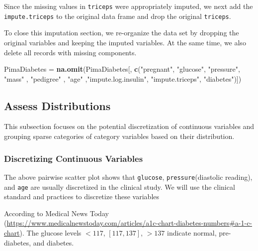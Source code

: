 \documentclass[
]{book}
\newenvironment{Shaded}{\begin{snugshade}}{\end{snugshade}}
\newcommand{\FunctionTok}[1]{\textcolor[rgb]{0.13,0.29,0.53}{\textbf{#1}}}
\newcommand{\NormalTok}[1]{#1}
\newcommand{\OtherTok}[1]{\textcolor[rgb]{0.56,0.35,0.01}{#1}}
\newcommand{\StringTok}[1]{\textcolor[rgb]{0.31,0.60,0.02}{#1}}
\begin{document}
Since the missing values in \texttt{triceps} were appropriately imputed, we next add the \texttt{impute.triceps} to the original data frame and drop the original \texttt{triceps}.

To close this imputation section, we re-organize the data set by dropping the original variables and keeping the imputed variables. At the same time, we also delete all records with missing components.

\begin{Shaded}
\begin{Highlighting}[]
\NormalTok{PimaDiabetes }\OtherTok{=} \FunctionTok{na.omit}\NormalTok{(PimaDiabetes[, }\FunctionTok{c}\NormalTok{(}\StringTok{"pregnant"}\NormalTok{, }\StringTok{"glucose"}\NormalTok{, }\StringTok{"pressure"}\NormalTok{, }\StringTok{"mass"}\NormalTok{ , }\StringTok{"pedigree"}\NormalTok{ , }\StringTok{"age"}\NormalTok{ ,}\StringTok{"impute.log.insulin"}\NormalTok{, }\StringTok{"impute.triceps"}\NormalTok{, }\StringTok{"diabetes"}\NormalTok{)])}
\end{Highlighting}
\end{Shaded}

\hfill\break

\hypertarget{assess-distributions}{%
\subsection{Assess Distributions}\label{assess-distributions}}

This subsection focuses on the potential discretization of continuous variables and grouping sparse categories of category variables based on their distribution.

\hypertarget{discretizing-continuous-variables}{%
\subsubsection{Discretizing Continuous Variables}\label{discretizing-continuous-variables}}

The above pairwise scatter plot shows that \texttt{glucose}, \texttt{pressure}(diastolic reading), and \texttt{age} are usually discretized in the clinical study. We will use the clinical standard and practices to discretize these variables

According to Medical News Today (\url{https://www.medicalnewstoday.com/articles/a1c-chart-diabetes-numbers\#a-1-c-chart}). The glucose levels \(< 117\), \([117, 137]\), \(>137\) indicate normal, pre-diabetes, and diabetes.
\end{document}
